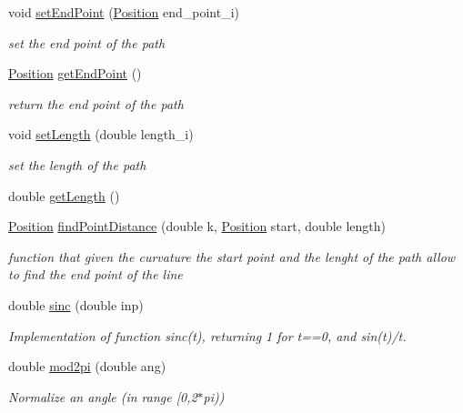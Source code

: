 \begin{DoxyCompactItemize}
void \mbox{\hyperlink{class_path2_d_1_1_line_aa937427619ef1923ab1cbc1aeb2e09f4}{set\+End\+Point}} (\mbox{\hyperlink{class_path2_d_1_1_position}{Position}} end\+\_\+point\+\_\+i)
\begin{DoxyCompactList}\small\item\em set the end point of the path \end{DoxyCompactList}\item 
\mbox{\hyperlink{class_path2_d_1_1_position}{Position}} \mbox{\hyperlink{class_path2_d_1_1_line_a71a3bb49c9a715a08138492e915126ab}{get\+End\+Point}} ()
\begin{DoxyCompactList}\small\item\em return the end point of the path \end{DoxyCompactList}\item 
void \mbox{\hyperlink{class_path2_d_1_1_line_a8934b16e891581297a40736e3bbee8f4}{set\+Length}} (double length\+\_\+i)
\begin{DoxyCompactList}\small\item\em set the length of the path \end{DoxyCompactList}\item 
double \mbox{\hyperlink{class_path2_d_1_1_line_a045b4ef907ad20703f00db4aec3971cd}{get\+Length}} ()
\item 
\mbox{\hyperlink{class_path2_d_1_1_position}{Position}} \mbox{\hyperlink{class_path2_d_1_1_line_a20b5965f24a983882c32b0bb65c08b4e}{find\+Point\+Distance}} (double k, \mbox{\hyperlink{class_path2_d_1_1_position}{Position}} start, double length)
\begin{DoxyCompactList}\small\item\em function that given the curvature the start point and the lenght of the path allow to find the end point of the line \end{DoxyCompactList}\item 
double \mbox{\hyperlink{class_path2_d_1_1_line_ad9ade8519fb65590d1d17162f05fa057}{sinc}} (double inp)
\begin{DoxyCompactList}\small\item\em Implementation of function sinc(t), returning 1 for t==0, and sin(t)/t. \end{DoxyCompactList}\item 
double \mbox{\hyperlink{class_path2_d_1_1_line_adac6f454be2ea8a8b6a05ae8212c093c}{mod2pi}} (double ang)
\begin{DoxyCompactList}\small\item\em Normalize an angle (in range \mbox{[}0,2$\ast$pi)) \end{DoxyCompactList}\item 

\end{DoxyCompactItemize}
